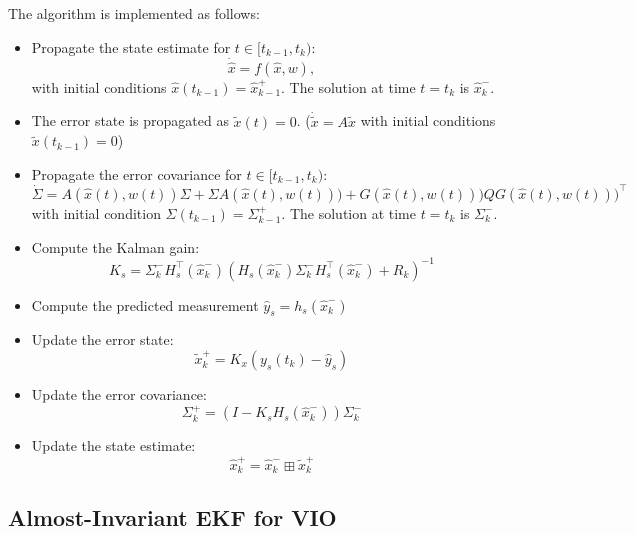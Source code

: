 The algorithm is implemented as follows:
\par{}
	\begin{itemize}
		\item Propagate the state estimate for $t\in[t_{k-1}, t_k)$:
			\[ 
			\dot{\hat{x}} = f(\hat{x}, w),
			\]
			with initial conditions $\hat{x}(t_{k-1}) = \hat{x}_{k-1}^+$.
			The solution at time $t=t_k$ is $\hat{x}_k^-$.
		\item The error state is propagated as $\tilde{x}(t)=0$. ($\dot{\tilde{x}}=A\tilde{x}$ with initial conditions $\tilde{x}(t_{k-1})=0$)
		\item Propagate the error covariance for $t\in[t_{k-1}, t_k)$:
			\[
			\dot{\Sigma} = A\left(\hat{x}(t), w(t)\right)\Sigma + \Sigma A\left(\hat{x}(t), w(t)\right)) + G\left(\hat{x}(t), w(t)\right)) Q G\left(\hat{x}(t), w(t)\right))^\top
			\]
			with initial condition $\Sigma(t_{k-1}) = \Sigma_{k-1}^+$. 
			The solution at time $t=t_k$ is $\Sigma_k^-$.
	\end{itemize}
\par{}
	\begin{itemize}
		\item Compute the Kalman gain:
			\[ 
			K_s = \Sigma_k^- H_s^\top(\hat{x}_k^-)\left(H_s(\hat{x}_k^-)\Sigma_k^-H_s^\top(\hat{x}_k^-)+R_k\right)^{-1}
			\]
		\item Compute the predicted measurement $\hat{y}_s = h_s(\hat{x}_k^-)$
		\item Update the error state:
			\[
			\tilde{x}_k^+ = K_x \left( y_s(t_k) - \hat{y}_s \right)
			\]
		\item Update the error covariance:
			\[
			\Sigma_k^+ = \left(I-K_s H_s(\hat{x}_k^-)\right)\Sigma_k^-
			\]
		\item Update the state estimate:
			\[
			\hat{x}_k^+ = \hat{x}_k^- \boxplus \tilde{x}_k^+
			\]
	\end{itemize}



\subsection{Almost-Invariant EKF for VIO}

